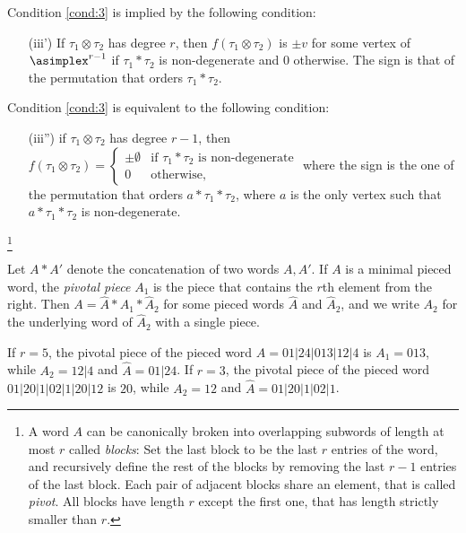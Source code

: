 \begin{remark}
	Condition \eqref{cond:3} is implied by the following condition:
    \begin{itemize}
        \item[(iii')] If $\tau_1\otimes\tau_2$ has degree $r$, then $f(\tau_1\otimes \tau_2)$ is $\pm v$ for some vertex of $\asimplex^{r-1}$ if $\tau_1* \tau_2$ is non-degenerate and $0$ otherwise. The sign is that of the permutation that orders $\tau_1*\tau_2$.
    \end{itemize}
    Condition \eqref{cond:3} is equivalent to the following condition:
    \begin{itemize}
    \item[(iii'')]if $\tau_1\otimes\tau_2$ has degree $r-1$, then $ f(\tau_1\otimes\tau_2) =
	\begin{cases}
	\pm \emptyset & \text{if $\tau_1* \tau_2$ is non-degenerate} \\
	0 & \text{otherwise},
    \end{cases}$
    where the sign is the one of the permutation that orders $a*\tau_1*\tau_2$, where $a$ is the only vertex such that $a*\tau_1*\tau_2$ is non-degenerate.
    \end{itemize}
\end{remark}



\footnote{{\color{red} A word $A$ can be canonically broken into overlapping subwords of length at most $r$ called \emph{blocks}: Set the last block to be the last $r$ entries of the word, and recursively define the rest of the blocks by removing the last $r-1$ entries of the last block. Each pair of adjacent blocks share an element, that is called {\color{red}\emph{pivot}}. All blocks have length $r$ except the first one, that has length strictly smaller than $r$.}}

Let $A*A'$ denote the concatenation of two words $A,A'$. If $A$ is a minimal pieced word, the \emph{pivotal piece} $A_1$ is the piece that contains the $r$th element from the right. Then $A=\hat{A}*A_1*\hat{A}_2$ for some pieced words $\hat{A}$ and $\hat{A}_2$, and we write $A_2$ for the underlying word of $\hat{A}_2$ with a single piece.
\begin{example}
	If $r=5$, the pivotal piece of the pieced word $A=01|24|013|12|4$ is $A_1 = 013$, while $A_2 = 12|4$ and $\hat{A} = 01|24$. If $r=3$, the pivotal piece of the pieced word $01|20|1|02|1|20|12$ is $20$, while $A_2 = 12$ and $\hat{A} = 01|20|1|02|1$. 
\end{example}

